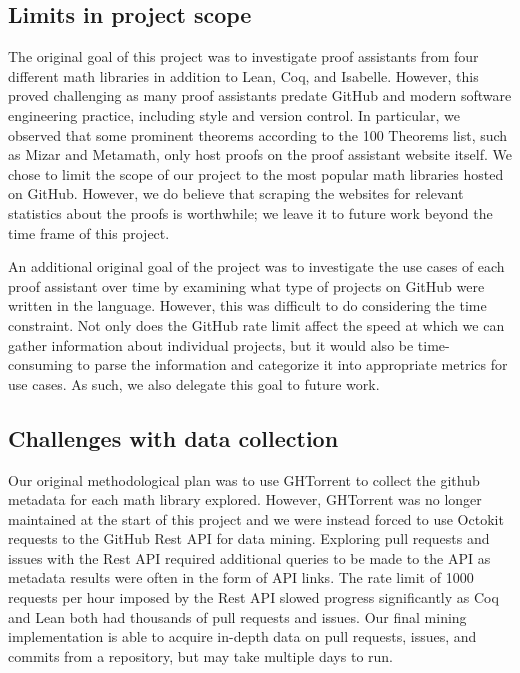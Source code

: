 \documentclass[sigconf,nonacm]{acmart}
\begin{document}
\subsection{Limits in project scope}

The original goal of this project was to investigate proof assistants from four different math libraries in addition to Lean, Coq, and Isabelle. However, this proved challenging as many proof assistants predate GitHub and modern software engineering practice, including style and version control. In particular, we observed that some prominent theorems according to the 100 Theorems list, such as Mizar and Metamath, only host proofs on the proof assistant website itself. We chose to limit the scope of our project to the most popular math libraries hosted on GitHub. However, we do believe that scraping the websites for relevant statistics about the proofs is worthwhile; we leave it to future work beyond the time frame of this project.

An additional original goal of the project was to investigate the use cases of each proof assistant over time by examining what type of projects on GitHub were written in the language. However, this was difficult to do considering the time constraint. Not only does the GitHub rate limit affect the speed at which we can gather information about individual projects, but it would also be time-consuming to parse the information and categorize it into appropriate metrics for use cases. As such, we also delegate this goal to future work.

\subsection{Challenges with data collection}

Our original methodological plan was to use GHTorrent to collect the github metadata for each math library explored. However, GHTorrent was no longer maintained at the start of this project and we were instead forced to use Octokit requests to the GitHub Rest API for data mining. Exploring pull requests and issues with the Rest API required additional queries to be made to the API as metadata results were often in the form of API links. The rate limit of 1000 requests per hour imposed by the Rest API slowed progress significantly as Coq and Lean both had thousands of pull requests and issues. Our final mining implementation is able to acquire in-depth data on pull requests, issues, and commits from a repository, but may take multiple days to run.
\end{document}

